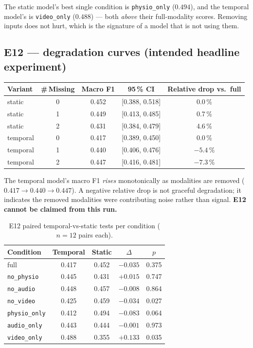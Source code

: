\documentclass[11pt,a4paper]{article}
\newcommand{\code}[1]{\texttt{\small #1}}
\newcommand{\alert}[1]{\textcolor{alertred}{\textbf{#1}}}
\begin{document}
\noindent
The static model's best single condition is \code{physio\_only} ($0.494$), and the
temporal model's is \code{video\_only} ($0.488$) --- both \emph{above} their full-modality
scores. Removing inputs does not hurt, which is the signature of a model that is not using
them.

\subsection{E12 --- degradation curves (intended headline experiment)}

\begin{center}\small
\begin{tabular}{lcccc}
\toprule
Variant & \#\,Missing & Macro F1 & 95\,\% CI & Relative drop vs.\ full \\
\midrule
static   & 0 & 0.452 & [0.388, 0.518] & \phantom{$-$}0.0\,\% \\
static   & 1 & 0.449 & [0.413, 0.485] & \phantom{$-$}0.7\,\% \\
static   & 2 & 0.431 & [0.384, 0.479] & \phantom{$-$}4.6\,\% \\
temporal & 0 & 0.417 & [0.389, 0.450] & \phantom{$-$}0.0\,\% \\
temporal & 1 & 0.440 & [0.406, 0.476] & $-5.4$\,\% \\
temporal & 2 & 0.447 & [0.416, 0.481] & $-7.3$\,\% \\
\bottomrule
\end{tabular}
\end{center}

\noindent
The temporal model's macro F1 \emph{rises} monotonically as modalities are removed
($0.417 \rightarrow 0.440 \rightarrow 0.447$). A negative relative drop is not graceful
degradation; it indicates the removed modalities were contributing noise rather than
signal. \alert{E12 cannot be claimed from this run.}

\begin{table}[h]\centering\small
\caption{E12 paired temporal-vs-static tests per condition ($n=12$ pairs each).}
\begin{tabular}{lcccc}
\toprule
Condition & Temporal & Static & $\Delta$ & $p$ \\
\midrule
full                & 0.417 & 0.452 & $-0.035$ & 0.375 \\
\code{no\_physio}   & 0.445 & 0.431 & $+0.015$ & 0.747 \\
\code{no\_audio}    & 0.448 & 0.457 & $-0.008$ & 0.864 \\
\code{no\_video}    & 0.425 & 0.459 & $-0.034$ & 0.027 \\
\code{physio\_only} & 0.412 & 0.494 & $-0.083$ & 0.064 \\
\code{audio\_only}  & 0.443 & 0.444 & $-0.001$ & 0.973 \\
\code{video\_only}  & 0.488 & 0.355 & $+0.133$ & 0.035 \\
\bottomrule
\end{tabular}
\end{table}
\end{document}
